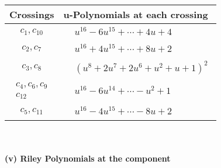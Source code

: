 \documentclass[1p]{elsarticle_modified}
\theoremstyle{definition}
\begin{document}
\begin{tabular}{m{50pt}|m{274pt}}
Crossings & \hspace{64pt}u-Polynomials at each crossing \\
\hline $$\begin{aligned}c_{1},c_{10}\end{aligned}$$&$\begin{aligned}
&u^{16}-6 u^{15}+\cdots+4 u+4
\end{aligned}$\\
\hline $$\begin{aligned}c_{2},c_{7}\end{aligned}$$&$\begin{aligned}
&u^{16}+4 u^{15}+\cdots+8 u+2
\end{aligned}$\\
\hline $$\begin{aligned}c_{3},c_{8}\end{aligned}$$&$\begin{aligned}
&(u^8+2 u^7+2 u^6+u^2+u+1)^2
\end{aligned}$\\
\hline $$\begin{aligned}c_{4},c_{6},c_{9}\\c_{12}\end{aligned}$$&$\begin{aligned}
&u^{16}-6 u^{14}+\cdots- u^2+1
\end{aligned}$\\
\hline $$\begin{aligned}c_{5},c_{11}\end{aligned}$$&$\begin{aligned}
&u^{16}-4 u^{15}+\cdots-8 u+2
\end{aligned}$\\
\hline
\end{tabular}\\~\\
\newpage\renewcommand{\arraystretch}{1}
\flushleft \textbf{(v) Riley Polynomials at the component}\newline \\
\end{document}
